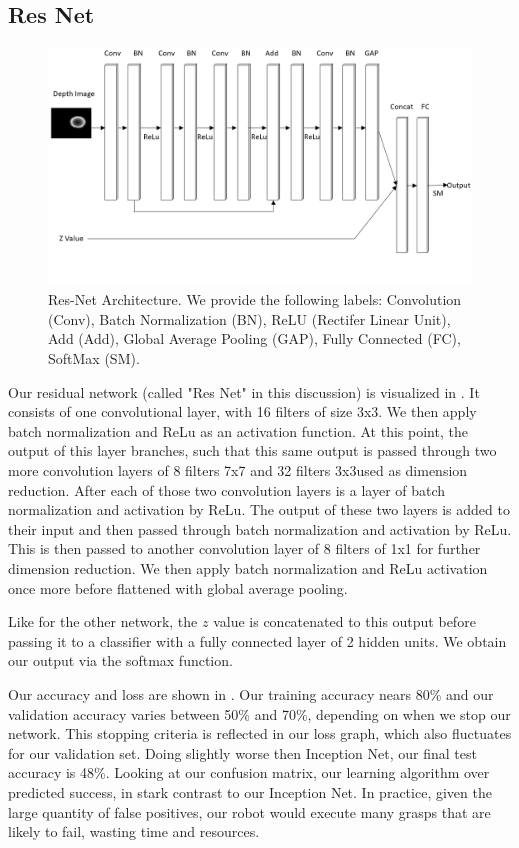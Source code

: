 \subsection{Res Net}

\begin{figure}[t!]
    \includegraphics[width=0.99\columnwidth]{figs/res_net.png}
\caption{Res-Net Architecture. We provide the following labels: Convolution (Conv), Batch Normalization (BN), ReLU (Rectifer Linear Unit), Add (Add), Global Average Pooling (GAP), Fully Connected (FC), SoftMax (SM).} \label{fig:res_net}
\end{figure}

Our residual network (called "Res Net" in this discussion) is visualized in . 
It consists of one convolutional layer, with 16 filters of size 3x3.
We then apply batch normalization and ReLu as an activation function.
At this point, the output of this layer branches, such that this same output is passed through two more convolution layers of 8 filters 7x7 and 32 filters 3x3used as dimension reduction. 
After each of those two convolution layers is a layer of batch normalization and activation by ReLu.
The output of these two layers is added to their input and then passed through batch normalization and activation by ReLu.
This is then passed to another convolution layer of 8 filters of 1x1 for further dimension reduction. 
We then apply batch normalization and ReLu activation once more before flattened with global average pooling. 

Like for the other network, the $z$ value is concatenated to this output before passing it to a classifier with a fully connected layer of 2 hidden units.
We obtain our output via the softmax function.

Our accuracy and loss are shown in . 
Our training accuracy nears 80\% and our validation accuracy varies between 50\% and 70\%, depending on when we stop our network. 
This stopping criteria is reflected in our loss graph, which also fluctuates for our validation set. 
Doing slightly worse then Inception Net, our final test accuracy is 48\%. 
Looking at our confusion matrix, our learning algorithm over predicted success, in stark contrast to our Inception Net. 
In practice, given the large quantity of false positives, our robot would execute many grasps that are likely to fail, wasting time and resources. 

